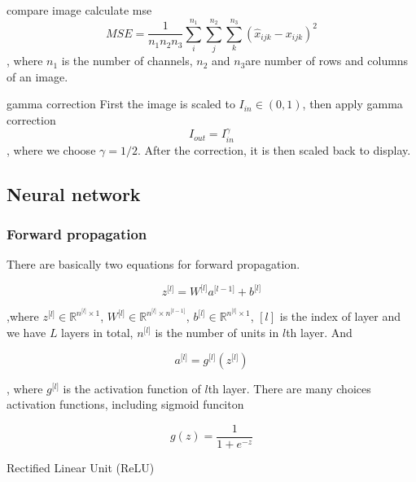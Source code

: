 \documentclass[11pt]{scrartcl} %
\begin{document}
compare image
calculate mse
\begin{equation}
MSE=\frac1{n_1n_2n_3}\sum_i^{n_1}\sum_j^{n_2}\sum_k^{n_3}{({\widehat x}_{ijk}-x_{ijk})}^2
\end{equation}
, where $n_1$ is the number of channels, $n_2$ and $n_3$are number of rows and columns of an image.

gamma correction
First the image is scaled to $I_{in}\in(0,1)$, then apply gamma correction
\begin{equation}
I_{out}=I_{in}^\gamma
\end{equation}
, where we choose $\gamma=1/2$. After the correction, it is then scaled back to display.


\subsection{Neural network}

\subsubsection{Forward propagation}

There are basically two equations for forward propagation.

\begin{equation}
z^{\lbrack l\rbrack}=W^{\lbrack l\rbrack}a^{\lbrack l-1\rbrack}+b^{\lbrack l\rbrack}
\label{fp1}
\end{equation}

,where $z^{\lbrack l\rbrack}\in\mathbb{R}^{n^{\lbrack l\rbrack}\times1}$, $W^{\lbrack l\rbrack}\in\mathbb{R}^{n^{\lbrack l\rbrack}\times n^{\lbrack l-1\rbrack}}$, $b^{\lbrack l\rbrack}\in\mathbb{R}^{n^{\lbrack l\rbrack}\times1}$, $[l]$ is the index of layer and we have $L$ layers in total, $n^{\lbrack l\rbrack}$ is the number of units in $l$th layer. And

\begin{equation}
a^{\lbrack l\rbrack}=g^{\lbrack l\rbrack}(z^{\lbrack l\rbrack})
\label{fp2}
\end{equation}

, where $g^{\lbrack l\rbrack}$ is the activation function of $l$th layer. There are many choices activation functions, including sigmoid funciton

\begin{equation}
g(z)=\frac1{1+e^{-z}}
\end{equation}

Rectified Linear Unit (ReLU)
\end{document}
